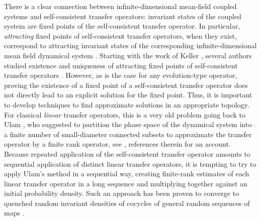 \documentclass[12pt]{article}
\theoremstyle{plain}
\begin{document}
There is a clear connection between infinite-dimensional mean-field coupled systems and self-consistent transfer operators: invariant states of the coupled system are fixed points of the self-consistent transfer operator. In particular, \emph{attracting} fixed points of self-consistent transfer operators, when they exist, correspond to attracting invariant states
of the corresponding infinite-dimensional mean field dynamical system \cite{BKZ09}.
Starting with the work of Keller \cite{keller00}, several authors studied existence and uniqueness of attracting fixed points of self-consistent transfer operators \cite{BK24,bahetal23,balintetal18,ST21,galatolo22}. However, as is the case for any evolution-type operator, proving the existence of a fixed point of a self-consistent transfer operator does not directly lead to an explicit solution for the fixed point. 
Thus, it is important to develop techniques to find approximate solutions in an appropriate topology. For classical \emph{linear} transfer operators, this is a very old problem going back to Ulam \cite{Ul60}, who suggested to partition the phase space of the dynamical system into a finite number of small-diameter connected subsets to approximate the  transfer operator by a finite rank operator, see \cite{liverani01}, references therein for an account. Because repeated application of the self-consistent transfer operator amounts to sequential application of distinct linear transfer operators, it is tempting to try to apply Ulam's method in a sequential way, creating finite-rank estimates of each linear transfer operator in a long sequence and multiplying together against an initial probability density. Such an approach has been proven to converge to quenched random invariant densities of cocycles of general random sequences of maps \cite{FGQ14,FGM19}. 
\end{document}
